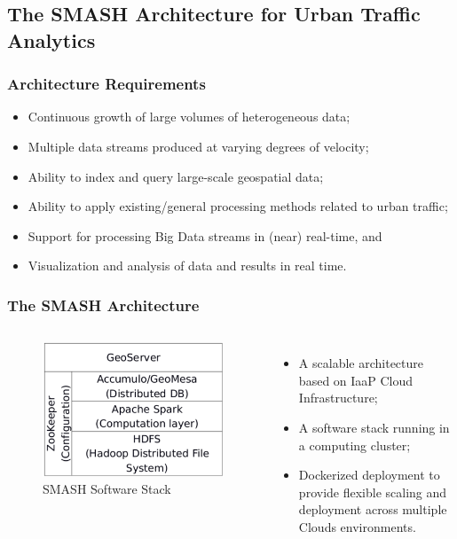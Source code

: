 \subsection{The SMASH Architecture for Urban Traffic Analytics}
\begin{frame}
    \frametitle{Architecture Requirements}
    \begin{itemize}
	    \item Continuous growth of large volumes of heterogeneous data;
	    \item Multiple data streams produced at varying degrees of velocity;
	    \item Ability to index and query large-scale geospatial data;
	    \item Ability to apply existing/general processing methods related to urban traffic;
	    \item Support for processing Big Data streams in (near) real-time, and
	    \item Visualization and analysis of data and results in real time.
    \end{itemize}
\end{frame}

\begin{frame}
    \frametitle{The SMASH Architecture}
    \begin{columns}
             \begin{figure}
                 \centering
                 \includegraphics[width=\textwidth]{resource/figures/smash_architecture.png}
                 \caption{SMASH Software Stack}
             \end{figure}
              \begin{itemize}
                \item A scalable architecture based on IaaP Cloud Infrastructure;
                \item A software stack running in a computing cluster;
                \item Dockerized deployment to provide flexible scaling and deployment across multiple Clouds environments.
              \end{itemize}
    \end{columns}
\end{frame}

